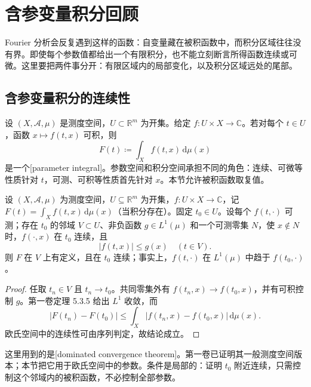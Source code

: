 \section{含参变量积分回顾}
\label{b2:sec:0103}

Fourier 分析会反复遇到这样的函数：自变量藏在被积函数中，而积分区域往往没有界。即使每个参数值都给出一个有限积分，也不能立刻断言所得函数连续或可微。这里要把两件事分开：有限区域内的局部变化，以及积分区域远处的尾部。

\subsection{含参变量积分的连续性}
\label{b2:subsec:010301}

设 \((X,\mathcal A,\mu)\) 是测度空间，\(U\subset\mathbb R^m\) 为开集。给定 \(f:U\times X\to\mathbb C\)。若对每个 \(t\in U\)，函数 \(x\mapsto f(t,x)\) 可积，则
\[
F(t)\coloneqq\int_X f(t,x)\,\mathrm{d}\mu(x)
\]
是一个[parameter integral]。参数空间和积分空间承担不同的角色：连续、可微等性质针对 \(t\)，可测、可积等性质首先针对 \(x\)。本节允许被积函数取复值。

\begin{proposition}\label{b2:prop:01-parameter-continuity}
设 \((X,\mathcal A,\mu)\) 为测度空间，\(U\subseteq\mathbb R^m\) 为开集，\(f:U\times X\to\mathbb C\)，记 \(F(t)=\int_X f(t,x)\,\mathrm d\mu(x)\)（当积分存在）。固定 \(t_0\in U\)。设每个 \(f(t,\cdot)\) 可测；存在 \(t_0\) 的邻域 \(V\subset U\)、非负函数 \(g\in L^1(\mu)\) 和一个可测零集 \(N\)，使 \(x\notin N\) 时，\(f(\cdot,x)\) 在 \(t_0\) 连续，且
\[
|f(t,x)|\leq g(x)\quad(t\in V).
\]
则 \(F\) 在 \(V\) 上有定义，且在 \(t_0\) 连续；事实上，\(f(t,\cdot)\) 在 \(L^1(\mu)\) 中趋于 \(f(t_0,\cdot)\)。
\end{proposition}
\begin{proof}
任取 \(t_n\in V\) 且 \(t_n\to t_0\)。共同零集外有 \(f(t_n,x)\to f(t_0,x)\)，并有可积控制 \(g\)。第一卷定理 5.3.5 给出 \(L^1\) 收敛，而
\[
|F(t_n)-F(t_0)|\leq\int_X|f(t_n,x)-f(t_0,x)|\,\mathrm{d}\mu(x).
\]
欧氏空间中的连续性可由序列判定，故结论成立。
\end{proof}

这里用到的是[dominated convergence theorem]。第一卷已证明其一般测度空间版本；本节把它用于欧氏空间中的参数。条件是局部的：证明 \(t_0\) 附近连续，只需控制这个邻域内的被积函数，不必控制全部参数。

